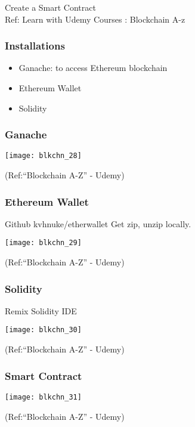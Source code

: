 \begin{frame}[fragile]\frametitle{}
\begin{center}
{\Large Create a Smart Contract}\\
{\small Ref: Learn with Udemy Courses : Blockchain A-z}
\end{center}
\end{frame}

\begin{frame}[fragile]\frametitle{Installations}
\begin{itemize}
\item Ganache: to access Ethereum blockchain
\item Ethereum Wallet
\item Solidity
\end{itemize}
\end{frame}

\begin{frame}[fragile]\frametitle{Ganache}
\begin{center}
\texttt{[image: blkchn\_28]}

{\tiny (Ref:``Blockchain A-Z'' - Udemy)}
\end{center}
\end{frame}

\begin{frame}[fragile]\frametitle{Ethereum Wallet}

Github kvhnuke/etherwallet Get zip, unzip locally.

\begin{center}
\texttt{[image: blkchn\_29]}

{\tiny (Ref:``Blockchain A-Z'' - Udemy)}
\end{center}
\end{frame}

\begin{frame}[fragile]\frametitle{Solidity}

Remix Solidity IDE

\begin{center}
\texttt{[image: blkchn\_30]}

{\tiny (Ref:``Blockchain A-Z'' - Udemy)}
\end{center}
\end{frame}

\begin{frame}[fragile]\frametitle{Smart Contract}

\begin{center}
\texttt{[image: blkchn\_31]}

{\tiny (Ref:``Blockchain A-Z'' - Udemy)}
\end{center}
\end{frame}